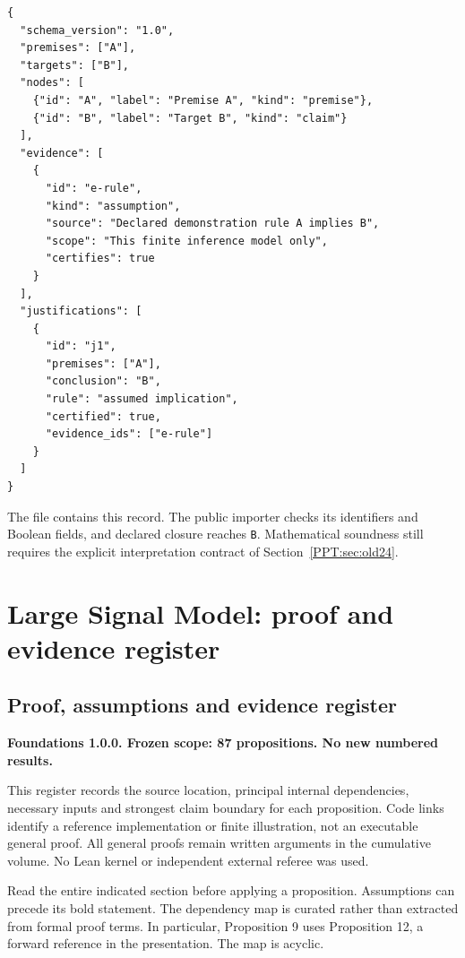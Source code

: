 \documentclass[11pt,oneside,openany]{book}
\numberwithin{equation}{section}
\begin{document}
\begin{lstlisting}[language={},basicstyle=\ttfamily\fontsize{9.5}{11.4}\selectfont]
{
  "schema_version": "1.0",
  "premises": ["A"],
  "targets": ["B"],
  "nodes": [
    {"id": "A", "label": "Premise A", "kind": "premise"},
    {"id": "B", "label": "Target B", "kind": "claim"}
  ],
  "evidence": [
    {
      "id": "e-rule",
      "kind": "assumption",
      "source": "Declared demonstration rule A implies B",
      "scope": "This finite inference model only",
      "certifies": true
    }
  ],
  "justifications": [
    {
      "id": "j1",
      "premises": ["A"],
      "conclusion": "B",
      "rule": "assumed implication",
      "certified": true,
      "evidence_ids": ["e-rule"]
    }
  ]
}
\end{lstlisting}

The file  contains this record. The public importer checks its identifiers and Boolean fields, and declared closure reaches \texttt{B}. Mathematical soundness still requires the explicit interpretation contract of Section~\ref{PPT:sec:old24}.




\chapter{Large Signal Model: proof and evidence register}\begingroup\setcounter{secnumdepth}{-1}\section{Proof, assumptions and evidence
register}\label{LSMRegister:proof-assumptions-and-evidence-register}

\textbf{Foundations 1.0.0. Frozen scope: 87 propositions. No new
numbered results.}

This register records the source location, principal internal
dependencies, necessary inputs and strongest claim boundary for each
proposition. Code links identify a reference implementation or finite
illustration, not an executable general proof. All general proofs remain
written arguments in the cumulative volume. No Lean kernel or
independent external referee was used.

Read the entire indicated section before applying a proposition.
Assumptions can precede its bold statement. The dependency map is
curated rather than extracted from formal proof terms. In particular,
Proposition 9 uses Proposition 12, a forward reference in the
presentation. The map is acyclic.
\end{document}
